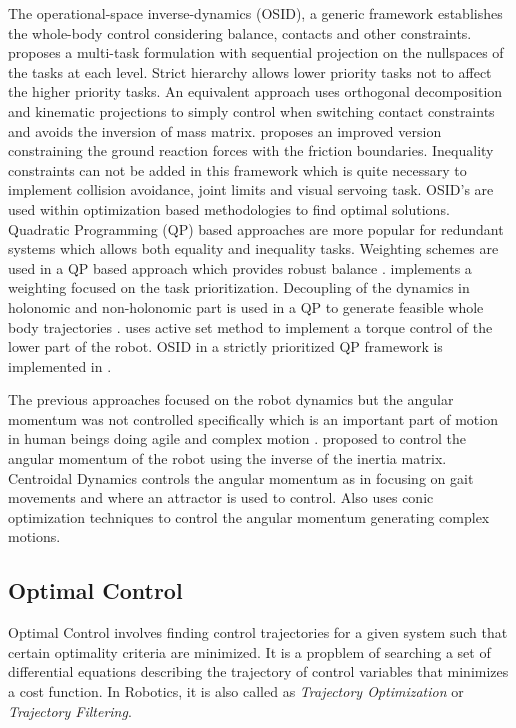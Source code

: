 The operational-space inverse-dynamics (OSID), a generic framework  establishes the whole-body control considering balance, contacts and other constraints. \cite{Khatib2004} proposes a multi-task formulation with sequential projection on  the nullspaces of the tasks at each level. Strict hierarchy allows lower priority tasks not to affect the higher priority tasks. An equivalent approach \cite{mistry2010inverse} uses orthogonal decomposition and kinematic projections to simply control when switching contact constraints and avoids the inversion of mass matrix. \cite{Righetti2011a,Righetti2011} proposes an improved version constraining the ground reaction forces with the friction boundaries. Inequality constraints can not be added in this framework which is quite necessary to implement collision avoidance, joint limits and visual servoing task. OSID's are used within optimization based methodologies to find optimal solutions. Quadratic Programming (QP) based approaches are more popular for redundant systems which allows both equality and inequality tasks. Weighting schemes are used in a QP based approach which provides robust balance \cite{collette2008robust}. \cite{Salini2011} implements a weighting focused on the task prioritization. Decoupling of the dynamics in holonomic and non-holonomic part is used in a QP to generate feasible whole body trajectories \cite{bouyarmane2012dynamics,wieber2006holonomy}. \cite{herzog2013experiments} uses active set method to implement a torque control of the lower part of the robot. OSID in a strictly prioritized QP framework is implemented in \cite{Saab2013}. 


The previous approaches focused on the robot dynamics but the angular momentum was not controlled specifically which is an important part of motion in human beings doing agile and complex motion \cite{popovic2004angular}. \cite{kajita2003resolved} proposed to control the angular momentum of the robot using the inverse of the inertia matrix. Centroidal Dynamics controls the angular momentum as in \cite{hofmann2009exploiting} focusing on gait movements and \cite{moro2013attractor} where an attractor is used to control. Also \cite{wensing2013generation} uses conic optimization techniques to control the angular momentum generating complex motions.

\subsection{Optimal Control}
Optimal Control involves finding control trajectories for a given system such that certain optimality criteria are minimized. It is a propblem of searching a set of differential equations describing the trajectory of control variables that minimizes a cost function. In Robotics, it is also called as \textit{Trajectory Optimization} or \textit{Trajectory Filtering}.


